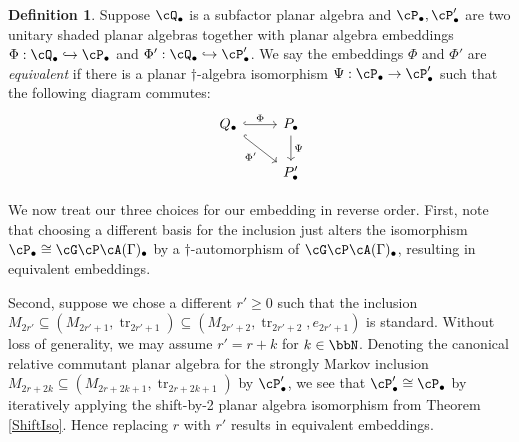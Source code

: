 \documentclass[11pt]{article}
\theoremstyle{plain}
\theoremstyle{definition}
\newtheorem{defn}[thm]{Definition}
\DeclareMathOperator{\tr}{tr}
\begin{document}
\begin{defn}
Suppose $\cQ_\bullet$ is a subfactor planar algebra and $\cP_\bullet, \cP_\bullet'$ are two unitary shaded planar algebras together with planar algebra embeddings $\Phi: \cQ_\bullet \hookrightarrow \cP_\bullet$ and $\Phi': \cQ_\bullet \hookrightarrow \cP_\bullet'$.
We say the embeddings $\Phi$ and $\Phi'$ are \emph{equivalent} if there is a planar $\dag$-algebra isomorphism $\Psi: \cP_\bullet \to \cP_\bullet'$ such that the following diagram commutes:
$$
  \begin{tikzcd}
    Q_{\bullet} \arrow[hook]{r}{\Phi} \arrow[swap, hook]{dr}{\Phi'} & P_{\bullet} \arrow{d}{\Psi} 
    \\
     & P_{\bullet}'
  \end{tikzcd}
$$  
\end{defn}


We now treat our three choices for our embedding in reverse order.
First, note that choosing a different basis for the inclusion just alters the isomorphism $\cP_\bullet \cong \cG\cP\cA(\Gamma)_\bullet$ by a $\dag$-automorphism of $\cG\cP\cA(\Gamma)_\bullet$, resulting in equivalent embeddings.

Second, suppose we chose a different $r'\geq 0$ such that the inclusion $M_{2r'}\subseteq (M_{2r'+1}, \tr_{2r'+1})\subseteq (M_{2r'+2}, \tr_{2r'+2}, e_{2r'+1})$ is standard.
Without loss of generality, we may assume $r' = r+k$ for $k\in \bbN$.
Denoting the canonical relative commutant planar algebra for the strongly Markov inclusion $M_{2r+2k}\subseteq (M_{2r+2k+1}, \tr_{2r+2k+1})$ by $\cP_\bullet'$, we see that $\cP_\bullet'\cong \cP_\bullet$ by iteratively applying the shift-by-2 planar algebra isomorphism from Theorem \ref{ShiftIso}. 
Hence replacing $r$ with $r'$ results in equivalent embeddings.
\end{document}

